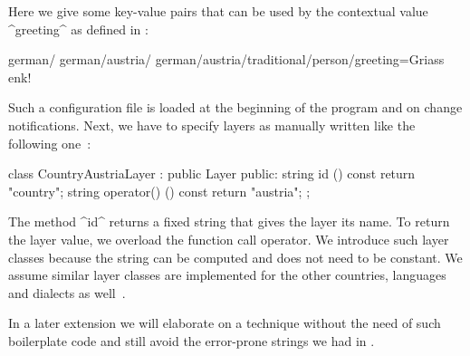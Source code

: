 \begin{example}
Here we give some key-value pairs that can be used by the contextual value ^greeting^ as defined in :

\begin{code}[language=CfgElektra]
german/%
german/austria/%
german/austria/traditional/person/greeting=Griass enk!
\end{code}

Such a configuration file is loaded at the beginning of the program and on change notifications.
Next, we have to specify layers as manually written  like the following one~\cite{raab2014program}:

\label{ex:country-austria-layer}
\begin{code}[language=Cpp]
class CountryAustriaLayer : public Layer {
public:
	string id () const { return "country"; }
	string operator() () const { return "austria"; }
};
\end{code}

The method ^id^ returns a fixed string that gives the layer its name.
To return the layer value, we overload the function call operator.
We introduce such layer classes because the string can be computed and does not need to be constant.
We assume similar layer classes are implemented for the other countries, languages and dialects as well~\cite{raab2014program}.
\end{example}
In a later extension we will elaborate on a technique without the need of such boilerplate code and still avoid the error-prone strings we had in .

